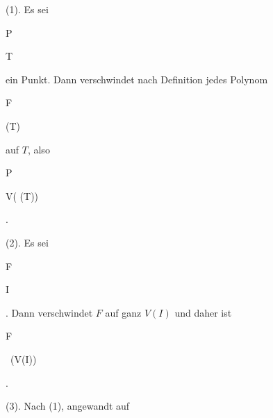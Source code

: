 {


(1). Es sei


\mavergleichskette


{\vergleichskette


{ P
}


{ \in }{ T
}


{  }{
}


{    }{
}


{   }{
}


}
{}{}{}
ein Punkt. Dann verschwindet nach Definition jedes Polynom


\mavergleichskette


{\vergleichskette


{ F
}


{ \in }{ (T)
}


{  }{
}


{    }{
}


{   }{
}


}
{}{}{}
auf $T$, also


\mavergleichskette


{\vergleichskette


{ P
}


{ \in }{ V(   (T))
}


{  }{
}


{    }{
}


{   }{
}


}
{}{}{.}


(2). Es sei


\mavergleichskette


{\vergleichskette


{ F
}


{ \in }{ I
}


{  }{
}


{    }{
}


{   }{
}


}
{}{}{.}
Dann verschwindet $F$ auf ganz $V(I)$ und daher ist


\mavergleichskette


{\vergleichskette


{ F
}


{ \in }{  \, (V(I))
}


{  }{
}


{    }{
}


{   }{
}


}
{}{}{.}


(3). Nach (1), angewandt auf


\mavergleichskette


}
